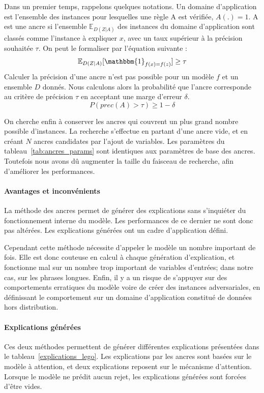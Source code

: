 Dans un premier temps, rappelons quelques notations. Un domaine d'application est l'ensemble des instances pour lesquelles une règle A est vérifiée, $A(.)=1$. A est une ancre si l'ensemble $\mathbb{E}_{D(Z|A)}$ des instances du domaine d'application sont classés comme l'instance à expliquer $x$, avec un taux supérieur à la précision souhaitée $\tau$. On peut le formaliser par l'équation suivante :
\begin{equation}
     \mathbb{E}_{D(Z|A)} [ \mathbbm{1}  _{f(x)=f(z)}] \geq \tau
\end{equation}
Calculer la précision d'une ancre n'est pas possible pour un modèle $f$ et un ensemble $D$ donnés.
Nous calculons alors la probabilité que l'ancre corresponde au critère de précision $\tau$ en acceptant une marge d'erreur $\delta$.
\begin{equation}
    P(prec(A) > \tau) \geq 1 - \delta
\end{equation}

On cherche enfin à conserver les ancres qui couvrent un plus grand nombre possible d'instances. La recherche s'effectue en partant d'une ancre vide, et en créant $N$ ancres candidates par l'ajout de variables.
Les paramètres du tableau~\ref{tab:ancres_params} sont identiques aux paramètres de base des ancres. Toutefois nous avons dû augmenter la taille du faisceau de recherche, afin d'améliorer les performances.

\paragraph{Avantages et inconvénients}
La méthode des ancres permet de générer des explications sans s'inquiéter du fonctionnement interne du modèle. Les performances de ce dernier ne sont donc pas altérées. Les explications générées ont un cadre d'application défini.

Cependant cette méthode nécessite d'appeler le modèle un nombre important de fois. Elle est donc couteuse en calcul à chaque génération d'explication, et fonctionne mal sur un nombre trop important de variables d'entrées; dans notre cas, sur les phrases longues. Enfin, il y a un risque de s'appuyer sur des comportements erratiques du modèle voire de créer des instances adversariales, en définissant le comportement sur un domaine d'application constitué de données hors distribution.

\paragraph{Explications générées}
Ces deux méthodes permettent de générer différentes explications présentées dans le tableau~\ref{explications_lego}. Les explications par les ancres sont basées sur le modèle à attention, et deux explications reposent sur le mécanisme d'attention. Lorsque le modèle ne prédit aucun rejet, les explications générées sont forcées d'être vides.

